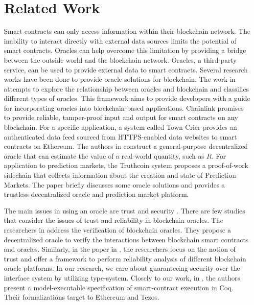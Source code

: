 \documentclass[a4paper]{llncs}
\begin{document}
\section{Related Work}
\label{sec:related work}
Smart contracts can only access information within their blockchain network. The inability to interact directly with external data sources limits the potential of smart contracts. Oracles \cite{oracle-patterns}\cite{call-action-oracle}\cite{oracles-study} can help overcome this limitation by providing a bridge between the outside world and the blockchain network. Oracles, a third-party service, can be used to provide external data to smart contracts. Several research works have been done to provide oracle solutions for blockchain. The work in \cite{blockchain-oracles} attempts to explore the relationship between oracles and blockchain and classifies different types of oracles. This framework aims to provide developers with a guide for incorporating oracles into blockchain-based applications. Chainlink \cite{chainlink-whitepaper} promises to provide reliable, tamper-proof input and output for smart contracts on any blockchain. For a specific application, a system called Town Crier \cite{town-crier} provides an authenticated data feed sourced from HTTPS-enabled data websites to smart contracts on Ethereum. The authors in \cite{oracle-real-value} construct a general-purpose decentralized oracle that can estimate the value of a real-world quantity, such as $R$. 
For application to prediction markets, the Truthcoin \cite{truthcoin-whitepaper} system proposes a proof-of-work sidechain that collects information about the creation and state of Prediction Markets. The paper \cite{astraea} briefly discusses some oracle solutions and provides a trustless decentralized oracle and prediction market platform. 

The main issues in using an oracle are trust and security \cite{trustworthy}. There are few studies that consider the issues of trust and reliability in blockchain oracles. The researchers in \cite{reliable-oracle} address the verification of blockchain oracles. They propose a decentralized oracle to verify the interactions between blockchain smart contracts and oracles. Similarly, in the paper in \cite{reliablity-oracles}, the researchers focus on the notion of trust and offer a framework to perform reliability analysis of different blockchain oracle platforms. In our research, we care about guaranteeing security over the interface system by utilizing type-system. Closely to our work, in \cite{interact-coq}, the authors present a model-executable specification of smart-contract execution in Coq. Their formalizations target to Ethereum and Tezos. 
\end{document}
